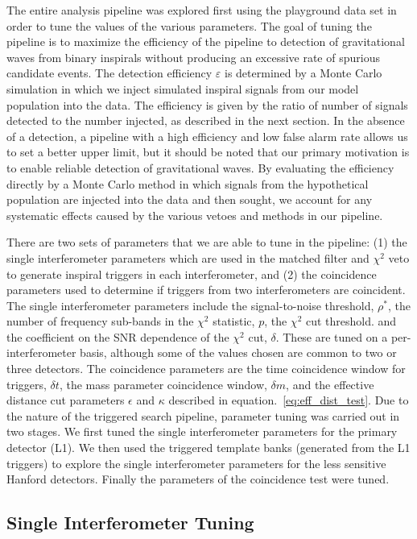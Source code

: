 The entire analysis pipeline was explored first using the playground data set
in order to tune the values of the various parameters. The goal of tuning the
pipeline is to maximize the efficiency of the pipeline to detection of
gravitational waves from binary inspirals without producing an excessive rate
of spurious candidate events.  The detection efficiency $\varepsilon$ is
determined by a Monte Carlo simulation in which we inject simulated inspiral
signals from our model population into the data. The efficiency is given by
the ratio of number of signals detected to the number injected, as described
in the next section.  In the absence of a detection, a pipeline with a high
efficiency and low false alarm rate allows us to set a better upper limit, but
it should be noted that our primary motivation is to enable reliable detection
of gravitational waves. By evaluating the efficiency directly by a Monte Carlo
method in which signals from the hypothetical population are injected into the
data and then sought, we account for any systematic effects caused by the
various vetoes and methods in our pipeline.

There are two sets of parameters that we are able to tune in the pipeline: (1)
the single interferometer parameters which are used in the matched filter and
$\chi^2$ veto to generate inspiral triggers in each interferometer, and (2)
the coincidence parameters used to determine if triggers from two
interferometers are coincident. The single interferometer parameters include
the signal-to-noise threshold, $\rho^\ast$, the number of frequency sub-bands
in the $\chi^2$ statistic, $p$, the $\chi^2$ cut threshold.
and the coefficient on the SNR dependence of the $\chi^2$ cut, $\delta$. These
are tuned on a per-interferometer basis, although some of the values chosen
are common to two or three detectors.  The coincidence parameters are the time
coincidence window for triggers, $\delta t$, the mass parameter coincidence
window, $\delta m$, and the effective distance cut parameters $\epsilon$ and
$\kappa$ described in equation.~\ref{eq:eff_dist_test}.  Due to the nature of the
triggered search pipeline, parameter tuning was carried out in two stages. We
first tuned the single interferometer parameters for the primary detector
(L1).  We then used the triggered template banks (generated from the L1
triggers) to explore the single interferometer parameters for the less
sensitive Hanford detectors. Finally the parameters of the coincidence test
were tuned.

\subsection{Single Interferometer Tuning}
\label{ss:single_ifo_tuning}

